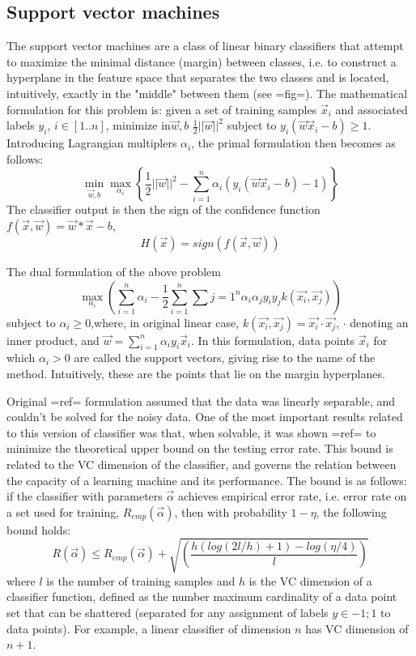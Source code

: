 \subsection{Support vector machines}
The support vector machines are a class of linear  binary classifiers that attempt to maximize the minimal distance (margin) between classes, i.e. to construct a hyperplane in the feature space that separates the two classes and is located, intuitively, exactly in the "middle" between them (see {{=fig=}}). The mathematical formulation for this problem is: given a set of training samples $\vec{x}_i$ and associated labels $y_i$, $i\in [1..n]$, minimize in$\vec{w},b$ $\frac{1}{2}||\vec{w}||^2$ subject to $y_i(\vec{w}\vec{x}_i-b)\ge 1$. Introducing Lagrangian multiplers $\alpha_i$, the primal formulation then becomes as follows: 
\begin{equation}
\label{simplePrimal}
\min_{\vec{w},b} \max_{\alpha_i}\left\{ \frac{1}{2}||\vec{w}||^2 -\sum_{i=1}^{n}\alpha_i(y_i(\vec{w}\vec{x}_i-b)-1)\right\}
\end{equation}
The classifier output is then the sign of the confidence function $f(\vec{x},\vec{w})=\vec{w}*\vec{x}-b$,
$$
\label{ClassifierOutput}
H(\vec{x})=sign(f(\vec{x},\vec{w}))
$$

The dual formulation of the above problem 
\begin{equation}
\label{simpleDual}
\max_{\alpha_i}\left ( \sum_{i=1}^{n}\alpha_i-\frac{1}{2}\sum_{i=1}^{n}\sum{j=1}^{n}\alpha_i \alpha_j y_i y_j k(\vec{x_i},\vec{x_j})\right)
\end{equation}
subject to $\alpha_i \ge 0$,where, in original linear case, $k(\vec{x_i},\vec{x_j})=\vec{x_i}\cdot \vec{x_j}$, $\cdot$ denoting an inner product, and $\vec{w}=\sum_{i=1}^{n}\alpha_i y_i \vec{x}_i$. In this formulation, data points $\vec{x}_i$ for which $\alpha_i>0$ are called the support vectors, giving rise to the name of the method. Intuitively, these are the points that lie on the margin hyperplanes. 

Original {{=ref=}} formulation assumed that the data was linearly separable, and couldn't be solved for the noisy data. One of the most important results related to this version of classifier was that, when solvable, it was shown {{=ref=}}  to minimize the theoretical upper bound on the testing error rate. This bound is related to the VC dimension of the classifier, and  governs the relation between the capacity of a learning machine and its performance. The bound is as follows: if the classifier with parameters $\vec{\alpha}$ achieves empirical error rate, i.e. error rate on a set used for training, $R_{emp}(\vec{\alpha})$, then with probability $1-\eta$, the following bound holds: 
\begin{equation}
\label{VCbound}
R(\vec{\alpha})\le R_{emp}(\vec{\alpha})+\sqrt{\left( \frac{h(log(2l/h)+1)-log(\eta/4)}{l}\right)}
\end{equation}
where $l$ is the number of training samples and $h$ is the VC dimension of a classifier function, defined as the number maximum cardinality of a data point set that can be shattered (separated for any assignment of labels $y\in{-1;1}$ to data points). For example, a linear classifier of dimension $n$ has VC dimension of $n+1$.

